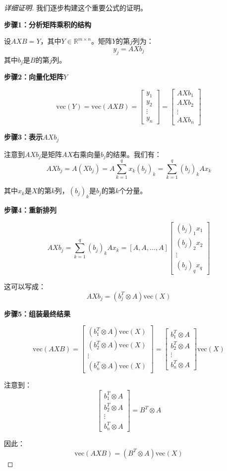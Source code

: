 \documentclass[11pt,a4paper]{ctexart}
\theoremstyle{definition}
\newcommand{\RR}{\mathbb{R}}
\newcommand{\vect}{\text{vec}}
\begin{document}
\begin{proof}[详细证明]
我们逐步构建这个重要公式的证明。

\textbf{步骤1：分析矩阵乘积的结构}

设$AXB = Y$，其中$Y \in \RR^{m \times n}$。矩阵$Y$的第$j$列为：
$$y_j = AXb_j$$
其中$b_j$是$B$的第$j$列。

\textbf{步骤2：向量化矩阵$Y$}

$$\vect(Y) = \vect(AXB) = \begin{bmatrix} y_1 \\ y_2 \\ \vdots \\ y_n \end{bmatrix} = \begin{bmatrix} AXb_1 \\ AXb_2 \\ \vdots \\ AXb_n \end{bmatrix}$$

\textbf{步骤3：表示$AXb_j$}

注意到$AXb_j$是矩阵$AX$右乘向量$b_j$的结果。我们有：
$$AXb_j = A(Xb_j) = A \sum_{k=1}^q x_k (b_j)_k = \sum_{k=1}^q (b_j)_k A x_k$$

其中$x_k$是$X$的第$k$列，$(b_j)_k$是$b_j$的第$k$个分量。

\textbf{步骤4：重新排列}

$$AXb_j = \sum_{k=1}^q (b_j)_k A x_k = [A, A, \ldots, A] \begin{bmatrix} (b_j)_1 x_1 \\ (b_j)_2 x_2 \\ \vdots \\ (b_j)_q x_q \end{bmatrix}$$

这可以写成：
$$AXb_j = (b_j^T \otimes A) \vect(X)$$

\textbf{步骤5：组装最终结果}

$$\vect(AXB) = \begin{bmatrix} (b_1^T \otimes A) \vect(X) \\ (b_2^T \otimes A) \vect(X) \\ \vdots \\ (b_n^T \otimes A) \vect(X) \end{bmatrix} = \begin{bmatrix} b_1^T \otimes A \\ b_2^T \otimes A \\ \vdots \\ b_n^T \otimes A \end{bmatrix} \vect(X)$$

注意到：
$$\begin{bmatrix} b_1^T \otimes A \\ b_2^T \otimes A \\ \vdots \\ b_n^T \otimes A \end{bmatrix} = B^T \otimes A$$

因此：$$\vect(AXB) = (B^T \otimes A) \vect(X)$$
\end{proof}
\end{document}
